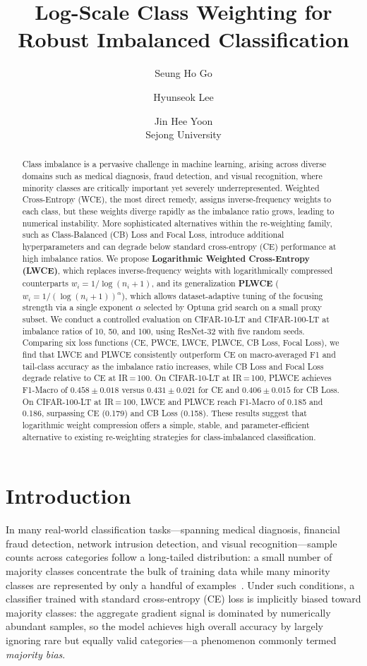 \documentclass[12pt]{article}
\title{Log-Scale Class Weighting for Robust Imbalanced Classification}
\author{Seung Ho Go \and Hyunseok Lee \and Jin Hee Yoon\\
        \small Sejong University}
\date{}
\begin{document}
\maketitle

\begin{abstract}
Class imbalance is a pervasive challenge in machine learning, arising across
diverse domains such as medical diagnosis, fraud detection, and visual recognition,
where minority classes are critically important yet severely underrepresented.
Weighted Cross-Entropy (WCE), the most direct remedy, assigns inverse-frequency
weights to each class, but these weights diverge rapidly as the imbalance ratio
grows, leading to numerical instability.
More sophisticated alternatives within the re-weighting family, such as
Class-Balanced (CB) Loss and Focal Loss, introduce additional hyperparameters
and can degrade below standard cross-entropy (CE) performance at high imbalance
ratios.
We propose \textbf{Logarithmic Weighted Cross-Entropy (LWCE)}, which replaces
inverse-frequency weights with logarithmically compressed counterparts
$w_i = 1/\log(n_i+1)$, and its generalization \textbf{PLWCE}
($w_i = 1/(\log(n_i+1))^\alpha$), which allows dataset-adaptive tuning of the
focusing strength via a single exponent $\alpha$ selected by Optuna grid search
on a small proxy subset.
We conduct a controlled evaluation on CIFAR-10-LT and CIFAR-100-LT at imbalance
ratios of 10, 50, and 100, using ResNet-32 with five random seeds.
Comparing six loss functions (CE, PWCE, LWCE, PLWCE, CB Loss, Focal Loss),
we find that LWCE and PLWCE consistently outperform CE on macro-averaged F1 and
tail-class accuracy as the imbalance ratio increases, while CB Loss and Focal Loss
degrade relative to CE at IR\,=\,100.
On CIFAR-10-LT at IR\,=\,100, PLWCE achieves F1-Macro of $0.458\pm0.018$
versus $0.431\pm0.021$ for CE and $0.406\pm0.015$ for CB Loss.
On CIFAR-100-LT at IR\,=\,100, LWCE and PLWCE reach F1-Macro of 0.185 and 0.186,
surpassing CE (0.179) and CB Loss (0.158).
These results suggest that logarithmic weight compression offers a simple, stable,
and parameter-efficient alternative to existing re-weighting strategies for
class-imbalanced classification.
\end{abstract}

\section{Introduction}
\label{sec:intro}

In many real-world classification tasks---spanning medical diagnosis, financial
fraud detection, network intrusion detection, and visual recognition---sample
counts across categories follow a long-tailed distribution: a small number of
majority classes concentrate the bulk of training data while many minority classes
are represented by only a handful of examples~\cite{cui2019,cao2019}.
Under such conditions, a classifier trained with standard cross-entropy (CE) loss is
implicitly biased toward majority classes: the aggregate gradient signal is dominated
by numerically abundant samples, so the model achieves high overall accuracy by
largely ignoring rare but equally valid categories---a phenomenon commonly termed
\textit{majority bias}.
\end{document}
